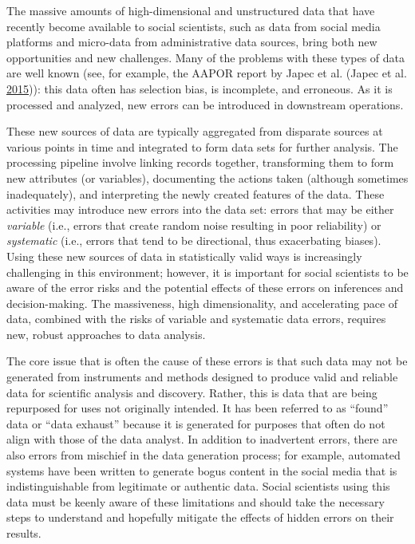 \documentclass[]{krantz}
\begin{document}
The massive amounts of high-dimensional and unstructured data that have
recently become available to social scientists, such as data from social
media platforms and micro-data from administrative data sources, bring
both new opportunities and new challenges. Many of the problems with
these types of data are well known (see, for example, the AAPOR report
by Japec et al. (Japec et al.
\protect\hyperlink{ref-japec2015big}{2015})): this data often has
selection bias, is incomplete, and erroneous. As it is processed and
analyzed, new errors can be introduced in downstream operations.

These new sources of data are typically aggregated from disparate
sources at various points in time and integrated to form data sets for
further analysis. The processing pipeline involve linking records
together, transforming them to form new attributes (or variables),
documenting the actions taken (although sometimes inadequately), and
interpreting the newly created features of the data. These activities
may introduce new errors into the data set: errors that may be either
\emph{variable} (i.e., errors that create random noise resulting in poor
reliability) or \emph{systematic} (i.e., errors that tend to be
directional, thus exacerbating biases). Using these new sources of data
in statistically valid ways is increasingly challenging in this
environment; however, it is important for social scientists to be aware
of the error risks and the potential effects of these errors on
inferences and decision-making. The massiveness, high dimensionality,
and accelerating pace of data, combined with the risks of variable and
systematic data errors, requires new, robust approaches to data
analysis.

The core issue that is often the cause of these errors is that such data
may not be generated from instruments and methods designed to produce
valid and reliable data for scientific analysis and discovery. Rather,
this is data that are being repurposed for uses not originally intended.
It has been referred to as ``found'' data or ``data exhaust'' because it
is generated for purposes that often do not align with those of the data
analyst. In addition to inadvertent errors, there are also errors from
mischief in the data generation process; for example, automated systems
have been written to generate bogus content in the social media that is
indistinguishable from legitimate or authentic data. Social scientists
using this data must be keenly aware of these limitations and should
take the necessary steps to understand and hopefully mitigate the
effects of hidden errors on their results.
\end{document}
